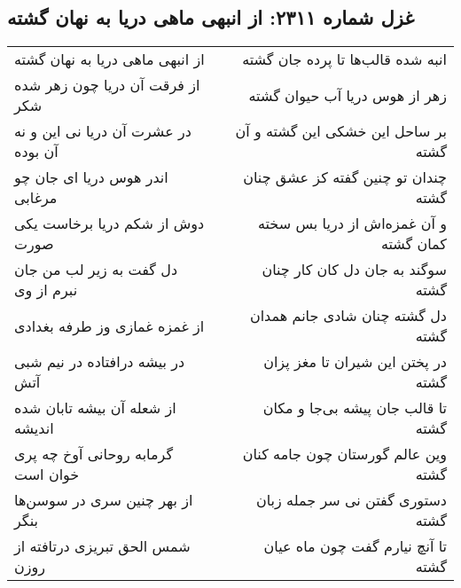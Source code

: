 \begin{center}
\section*{غزل شماره ۲۳۱۱: از انبهی ماهی دریا به نهان گشته}
\label{sec:2311}
\begin{longtable}{l p{0.5cm} r}
از انبهی ماهی دریا به نهان گشته
&&
انبه شده قالب‌ها تا پرده جان گشته
\\
از فرقت آن دریا چون زهر شده شکر
&&
زهر از هوس دریا آب حیوان گشته
\\
در عشرت آن دریا نی این و نه آن بوده
&&
بر ساحل این خشکی این گشته و آن گشته
\\
اندر هوس دریا ای جان چو مرغابی
&&
چندان تو چنین گفته کز عشق چنان گشته
\\
دوش از شکم دریا برخاست یکی صورت
&&
و آن غمزه‌اش از دریا بس سخته کمان گشته
\\
دل گفت به زیر لب من جان نبرم از وی
&&
سوگند به جان دل کان کار چنان گشته
\\
از غمزه غمازی وز طرفه بغدادی
&&
دل گشته چنان شادی جانم همدان گشته
\\
در بیشه درافتاده در نیم شبی آتش
&&
در پختن این شیران تا مغز پزان گشته
\\
از شعله آن بیشه تابان شده اندیشه
&&
تا قالب جان پیشه بی‌جا و مکان گشته
\\
گرمابه روحانی آوخ چه پری خوان است
&&
وین عالم گورستان چون جامه کنان گشته
\\
از بهر چنین سری در سوسن‌ها بنگر
&&
دستوری گفتن نی سر جمله زبان گشته
\\
شمس الحق تبریزی درتافته از روزن
&&
تا آنچ نیارم گفت چون ماه عیان گشته
\\
\end{longtable}
\end{center}
